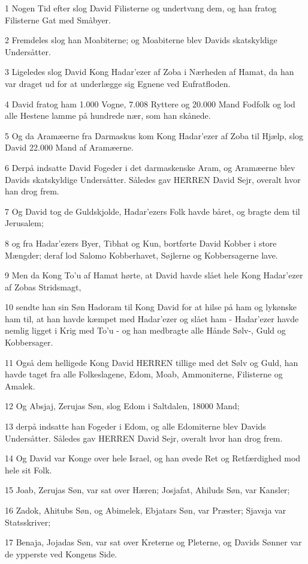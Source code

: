 \par 1 Nogen Tid efter slog David Filisterne og undertvang dem, og han fratog Filisterne Gat med Småbyer.
\par 2 Fremdeles slog han Moabiterne; og Moabiterne blev Davids skatskyldige Undersåtter.
\par 3 Ligeledes slog David Kong Hadar'ezer af Zoba i Nærheden af Hamat, da han var draget ud for at underlægge sig Egnene ved Eufratfloden.
\par 4 David fratog ham 1.000 Vogne, 7.008 Ryttere og 20.000 Mand Fodfolk og lod alle Hestene lamme på hundrede nær, som han skånede.
\par 5 Og da Aramæerne fra Darmaskus kom Kong Hadar'ezer af Zoba til Hjælp, slog David 22.000 Mand af Aramæerne.
\par 6 Derpå indsatte David Fogeder i det darmaskenske Aram, og Aramæerne blev Davids skatskyldige Undersåtter. Således gav HERREN David Sejr, overalt hvor han drog frem.
\par 7 Og David tog de Guldskjolde, Hadar'ezers Folk havde båret, og bragte dem til Jerusalem;
\par 8 og fra Hadar'ezers Byer, Tibhat og Kun, bortførte David Kobber i store Mængder; deraf lod Salomo Kobberhavet, Søjlerne og Kobbersagerne lave.
\par 9 Men da Kong To'u af Hamat hørte, at David havde slået hele Kong Hadar'ezer af Zobas Stridsmagt,
\par 10 sendte han sin Søn Hadoram til Kong David for at hilse på ham og lykønske ham til, at han havde kæmpet med Hadar'ezer og slået ham - Hadar'ezer havde nemlig ligget i Krig med To'u - og han medbragte alle Hånde Sølv-, Guld og Kobbersager.
\par 11 Også dem helligede Kong David HERREN tillige med det Sølv og Guld, han havde taget fra alle Folkeslagene, Edom, Moab, Ammoniterne, Filisterne og Amalek.
\par 12 Og Absjaj, Zerujas Søn, slog Edom i Saltdalen, 18000 Mand;
\par 13 derpå indsatte han Fogeder i Edom, og alle Edomiterne blev Davids Undersåtter. Således gav HERREN David Sejr, overalt hvor han drog frem.
\par 14 Og David var Konge over hele Israel, og han øvede Ret og Retfærdighed mod hele sit Folk.
\par 15 Joab, Zerujas Søn, var sat over Hæren; Josjafat, Ahiluds Søn, var Kansler;
\par 16 Zadok, Ahitubs Søn, og Abimelek, Ebjatars Søn, var Præster; Sjavsja var Statsskriver;
\par 17 Benaja, Jojadas Søn, var sat over Kreterne og Pleterne, og Davids Sønner var de ypperste ved Kongens Side.

